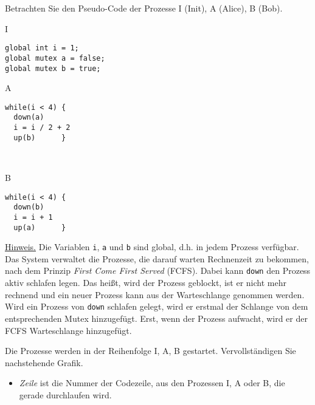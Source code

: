 \documentclass{uebungsblatt}
\begin{document}
\begin{aufgabe}
Betrachten Sie den Pseudo-Code der Prozesse I (Init), A (Alice), B (Bob).

\medskip
\begin{minipage}[t]{.4\textwidth}
\program
I
\begin{lstlisting}
global int i = 1;
global mutex a = false;
global mutex b = true;
\end{lstlisting}
\end{minipage}

\smallskip
\begin{minipage}[t]{.4\textwidth}
\program
A
\begin{lstlisting}[firstnumber=4]
while(i < 4) {
  down(a)
  i = i / 2 + 2
  up(b)      }
\end{lstlisting}
\end{minipage}
\begin{minipage}[t]{.05\textwidth}
\mbox{~}
\end{minipage}
\begin{minipage}[t]{.4\textwidth}
\program
B
\begin{lstlisting}[firstnumber=8]
while(i < 4) {
  down(b)
  i = i + 1
  up(a)      }
\end{lstlisting}
\end{minipage}

\medskip
\underline{Hinweis.}
Die Variablen \texttt{i}, \texttt{a} und \texttt{b} sind global,
d.h. in jedem Prozess verfügbar.\\
\medskip
Das System verwaltet
die Prozesse, die darauf warten Rechnenzeit zu bekommen, nach dem Prinzip
\textit{First Come First Served} (FCFS). Dabei kann \texttt{down} den Prozess aktiv schlafen legen. Das heißt, wird der Prozess geblockt, ist er nicht mehr rechnend und ein neuer Prozess kann aus der Warteschlange genommen werden. Wird ein Prozess von \texttt{down} schlafen gelegt, wird er erstmal der Schlange von dem entsprechenden  Mutex hinzugefügt. Erst, wenn der Prozess aufwacht, wird er der FCFS Warteschlange hinzugefügt.

\medskip
Die Prozesse werden in der Reihenfolge I, A, B gestartet.
\medskip
Vervollständigen Sie nachstehende Grafik. 

\begin{itemize}
\item
\textit{Zeile} ist die Nummer der Codezeile, 
aus den Prozessen I, A oder B, die gerade durchlaufen wird. 


\end{itemize}
\end{aufgabe}
\end{document}
